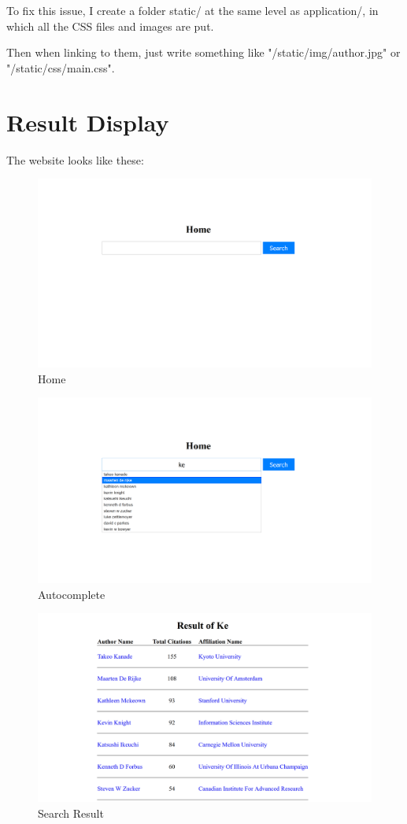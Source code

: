 \documentclass[a4paper]{article}
\begin{document}
To fix this issue, I create a folder static/ at the same level as application/, in which all the CSS files and images are put.

Then when linking to them, just write something like "/static/img/author.jpg" or "/static/css/main.css".
    \section{Result Display}
The website looks like these:
        \begin{figure}[H]
            \centering
            \includegraphics[width=.8\textwidth]{img/1.png}
            \caption{Home}
        \end{figure}
        \begin{figure}[H]
            \centering
            \includegraphics[width=.8\textwidth]{img/2.png}
            \caption{Autocomplete}
        \end{figure}
        \begin{figure}[H]
            \centering
            \includegraphics[width=.8\textwidth]{img/3.png}
            \caption{Search Result}
        \end{figure}
\end{document}

